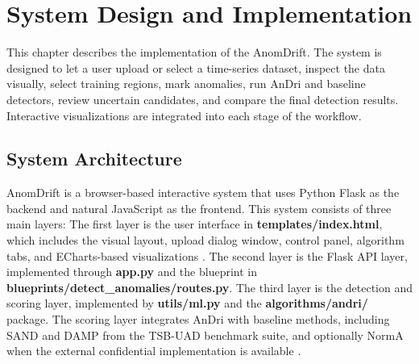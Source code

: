 \chapter{System Design and Implementation}

This chapter describes the implementation of the AnomDrift.  The system is designed to let a user upload or select a time-series dataset, inspect the data visually, select training regions, mark anomalies, run AnDri and baseline detectors, review uncertain candidates, and compare the final detection results. Interactive visualizations are integrated into each stage of the workflow.

\section{System Architecture}

AnomDrift is a browser-based interactive system that uses Python Flask as the backend and natural JavaScript as the frontend. This system consists of three main layers: The first layer is the user interface in \textbf{templates/index.html}, which includes the visual layout, upload dialog window, control panel, algorithm tabs, and ECharts-based visualizations \cite{apacheecharts}. The second layer is the Flask API layer, implemented through \textbf{app.py} and the blueprint in \textbf{blueprints/detect\_anomalies/routes.py}. The third layer is the detection and scoring layer, implemented by \textbf{utils/ml.py} and the \textbf{algorithms/andri/} package. The scoring layer integrates AnDri with baseline methods, including SAND and DAMP from the TSB-UAD benchmark suite, and optionally NormA when the external confidential implementation is available \citep{boniol2021norma,boniol2021sand,lu2022damp,paparrizos2022tsbuad}.

